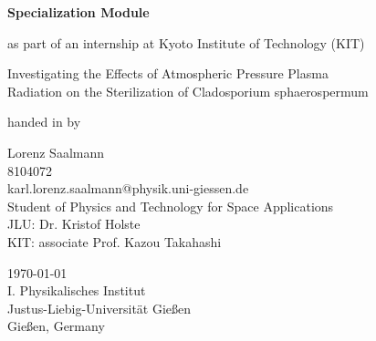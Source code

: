{%
\pagestyle{empty}
\sffamily

\vspace{1cm}
\vfill
{\bfseries \Large Specialization Module}

{\Large as part of an internship at Kyoto Institute of Technology (KIT)}

\vspace{1cm}

{\Large Investigating the Effects of 
Atmospheric Pressure Plasma\\ Radiation 
on the Sterilization of Cladosporium sphaerospermum}
\vfill

handed in by

{\Large Lorenz Saalmann}\\[1.0ex]
{\large {8104072}}\\[.2ex]
{karl.lorenz.saalmann@physik.uni-giessen.de}\\[2ex]
{\large {Student of Physics and Technology for Space Applications}}\\[.5ex]


{\large {JLU:    Dr. Kristof Holste}}\\[.5ex]
{\large {KIT:    associate Prof. Kazou Takahashi}}\\[.5ex]


\vfill



{\large {\today}}\\[.5ex]

{\large {I. Physikalisches Institut}}\\[.5ex]
{\large {Justus-Liebig-Universität Gießen}}\\[.5ex]
{\large {Gießen, Germany}}\\[.5ex]

\cleardoublepage
}%